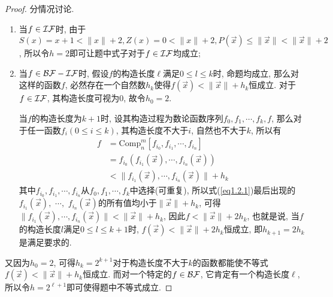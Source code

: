 \begin{proof}
分情况讨论.
\begin{enumerate}
\item 当$f\in\mathcal{IF}$时, 由于$S(x)=x+1<\|x\|+2,Z(x)=0<\|x\|+2,P(\vec{x})\leqslant\|\vec{x}\|<\|\vec{x}\|+2$, 所以令$h=2$即可让题中式子对于$f\in\mathcal{IF}$均成立;
\item 当$f\in\mathcal{BF}-\mathcal{IF}$时, 假设$f$的构造长度$\ell$满足$0\leqslant l \leqslant k$时, 命题均成立, 那么对这样的函数$f$, 必然存在一个自然数$h_k$使得$f(\vec{x})<\|\vec{x}\|+h_k$恒成立. 对于$f\in\mathcal{IF}$, 其构造长度可视为0, 故令$h_0=2$.

当$f$的构造长度为$k+1$时, 设其构造过程为数论函数序列$f_0,f_1,\cdots,f_k,f$, 那么对于任一函数$f_i(0\leqslant i\leqslant k)$, 其构造长度不大于$i$, 自然也不大于$k$, 所以有
\begin{equation}\label{eq1.2.1}
\begin{split}
	f&=\mathrm{Comp}_n^m[f_{i_0},f_{i_1},\cdots,f_{i_n}]\\
	 &=f_{i_0}(f_{i_1}(\vec{x}),\cdots,f_{i_n}(\vec{x}))\\
	 &<\|f_{i_1}(\vec{x}),\cdots,f_{i_n}(\vec{x})\|+h_k
\end{split}
\end{equation}
其中$f_{i_0},f_{i_1},\cdots,f_{i_n}$从$f_0,f_1,\cdots,f_k$中选择(可重复), 所以式(\ref{eq1.2.1})最后出现的$f_{i_1}(\vec{x}),$ $\cdots,$ $f_{i_n}(\vec{x})$的所有值均小于$\|\vec{x}\|+h_k$, 可得$\|f_{i_1}(\vec{x}),\cdots,f_{i_n}(\vec{x})\|<\|\vec{x}\|+h_k$, 因此$f<\|\vec{x}\|+2h_k$, 也就是说, 当$f$的构造长度$l$满足$0\leqslant l\leqslant k+1$时, $f(\vec{x})<\|\vec{x}\|+2h_k$恒成立, 即$h_{k+1}=2h_k$是满足要求的.
\end{enumerate}

又因为$h_0=2$, 可得$h_k=2^{k+1}$对于构造长度不大于$k$的函数都能使不等式$f(\vec{x})<\|\vec{x}\|+h_k$恒成立. 而对一个特定的$f\in\mathcal{BF}$, 它肯定有一个构造长度$\ell$, 所以令$h=2^{\ell+1}$即可使得题中不等式成立.
\end{proof}